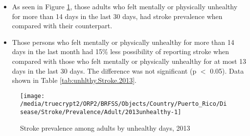 \newpage
\begin{itemize}

\item As seen in Figure \ref{fig:unhlthy.Stroke.2013}, those adults who felt mentally or physically unhealthy for more than 14 days in the last 30 days, had  
stroke prevalence when compared with their counterpart.


\item Those persons who felt mentally or physically unhealthy for more than 14 days in the last month had 15\% less possibility of reporting stroke when compared with those who felt mentally or physically unhealthy for at most 13 days in the last 30 days. The difference was not significant (p $<$ 0.05). Data shown in Table \ref{tab:unhlthy.Stroke.2013}.

\end{itemize}

\begin{figure}[H]
\caption{Stroke prevalence among adults by unhealthy days, 2013}
\label{fig:unhlthy.Stroke.2013}

\begin{knitrout}
\color{fgcolor}

{\centering \texttt{[image: /media/truecrypt2/ORP2/BRFSS/Objects/Country/Puerto\_Rico/Disease/Stroke/Prevalence/Adult/2013unhealthy-1]} 

}



\end{knitrout}
\end{figure}

